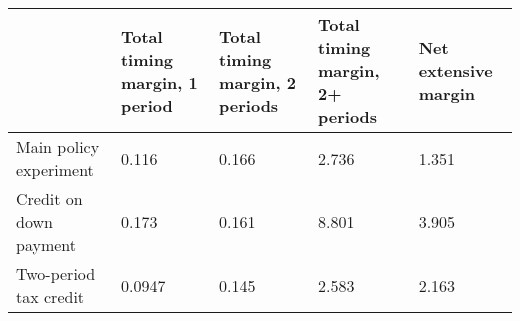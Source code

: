 \begin{tabular}{p{2.5cm}p{1.5cm}p{1.5cm}p{1.5cm}p{1.5cm}}
\hline\hline
                    &Total timing margin, 1 period&Total timing margin, 2 periods&Total timing margin, 2+ periods&Net extensive margin\\
\hline
Main policy experiment&       0.116&       0.166&       2.736&       1.351\\
Credit on down payment &       0.173&       0.161&       8.801&       3.905\\
Two-period tax credit&      0.0947&       0.145&       2.583&       2.163\\
\hline\hline
\end{tabular}
